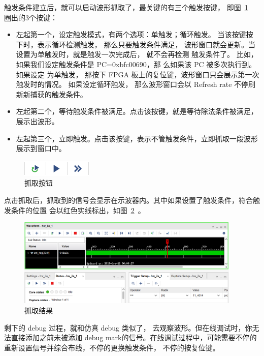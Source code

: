 \documentclass[ichigo,normal,cn]{elegantnote_mod}
\begin{document}
触发条件建立后，就可以启动波形抓取了，最关键的有三个触发按键，
即图~\ref{fig:ILA5}~ 圈出的3个按键：

\begin{itemize}
    \item 左起第一个，设定触发模式，有两个选项：单触发；循环触发。
    当该按键按下时，表示循环检测触发， 那么只要触发条件满足，
    波形窗口就会更新。当设置为单触发时，就是触发一次完成后，
    就不会再检测 触发条件了。
    比如，如果我们设定触发条件是 PC=0xbfc00690，那
    么如果该 PC 被多次执行到。如果设定 为单触发，
    那按下 FPGA 板上的复位键，波形窗口只会展示第一次触发时的情况。
    如果设定循环触发， 那么波形窗口会以 Refresh rate 
    不停刷新新捕获的触发条件。
    \item 左起第二个，等待触发条件被满足。点击该按键，就是等待除法条件被满足，展示出波形。 
    \item 左起第三个，立即触发。点击该按键，表示不管触发条件，立即抓取一段波形展示到窗口中。 
\end{itemize}

\begin{figure}[!htbp]
    \centering
    \includegraphics[width=0.3\textwidth]{fig/ILA5}
    \caption{抓取按钮}
    \label{fig:ILA5}
\end{figure}

点击抓取后，抓取到的信号会显示在示波器内。其中如果设置了触发条件，符合触发条件的位置
会以红色实线标出，如图~\ref{fig:ILA6}~。

\begin{figure}[!htbp]
    \centering
    \includegraphics[width=0.95\textwidth]{fig/ILA6}
    \caption{抓取结果}
    \label{fig:ILA6}
\end{figure}

剩下的 debug 过程，就和仿真 debug 类似了，
去观察波形。但在线调试时，你无法直接添加之前未被添加 
debug mark的信号。在线调试过程中，可能需要不停的重新设置信号并综合布线，不停的更换触发条件，
不停的按复位键。 
\end{document}
